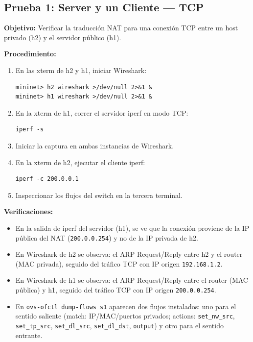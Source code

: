\documentclass[11pt, a4paper]{article}
\begin{document}
\subsection{Prueba 1: Server y un Cliente --- TCP}

\textbf{Objetivo:} Verificar la traducción NAT para una conexión TCP entre un host privado (h2) y el servidor público (h1).

\textbf{Procedimiento:}
\begin{enumerate}
    \item En las xterm de h2 y h1, iniciar Wireshark:
\begin{verbatim}
mininet> h2 wireshark >/dev/null 2>&1 &
mininet> h1 wireshark >/dev/null 2>&1 &
\end{verbatim}
    \item En la xterm de h1, correr el servidor iperf en modo TCP:
\begin{verbatim}
iperf -s
\end{verbatim}
    \item Iniciar la captura en ambas instancias de Wireshark.
    \item En la xterm de h2, ejecutar el cliente iperf:
\begin{verbatim}
iperf -c 200.0.0.1
\end{verbatim}
    \item Inspeccionar los flujos del switch en la tercera terminal.
\end{enumerate}

\textbf{Verificaciones:}
\begin{itemize}
    \item En la salida de iperf del servidor (h1), se ve que la conexión proviene de la IP pública del NAT (\texttt{200.0.0.254}) y no de la IP privada de h2.
    \item En Wireshark de h2 se observa: el ARP Request/Reply entre h2 y el router (MAC privada), seguido del tráfico TCP con IP origen \texttt{192.168.1.2}.
    \item En Wireshark de h1 se observa: el ARP Request/Reply entre el router (MAC pública) y h1, seguido del tráfico TCP con IP origen \texttt{200.0.0.254}.
    \item En \texttt{ovs-ofctl dump-flows s1} aparecen dos flujos instalados: uno para el sentido saliente (match: IP/MAC/puertos privados; actions: \texttt{set\_nw\_src}, \texttt{set\_tp\_src}, \texttt{set\_dl\_src}, \texttt{set\_dl\_dst}, \texttt{output}) y otro para el sentido entrante.
\end{itemize}
\end{document}
